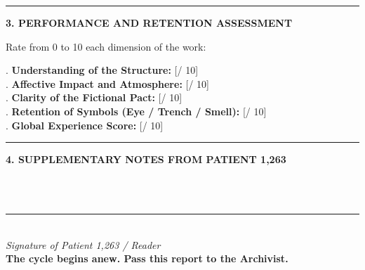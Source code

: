 \vspace{0.8em}
\noindent\rule{\textwidth}{0.5pt}
\vspace{0.5em}

\noindent\textbf{3. PERFORMANCE AND RETENTION ASSESSMENT}

\vspace{0.4em}
\noindent Rate from 0 to 10 each dimension of the work:

\vspace{0.3em}
. \textbf{Understanding of the Structure:} [\qquad / 10]\\[0.25em]
. \textbf{Affective Impact and Atmosphere:} [\qquad / 10]\\[0.25em]
. \textbf{Clarity of the Fictional Pact:} [\qquad / 10]\\[0.25em]
. \textbf{Retention of Symbols (Eye / Trench / Smell):} [\qquad / 10]\\[0.25em]
. \textbf{Global Experience Score:} [\qquad / 10]

\vspace{1em}
\noindent\rule{\textwidth}{0.5pt}
\vspace{0.5em}

\noindent\textbf{4. SUPPLEMENTARY NOTES FROM PATIENT 1,263}

\vspace{0.5em}
\noindent\dotfill\\[0.4em]
\noindent\dotfill\\[0.4em]
\noindent\dotfill

\vspace{1.5em}
\begin{center}
\rule{0.5\textwidth}{0.5pt}\\[0.4em]
\textit{Signature of Patient 1,263 / Reader}\\[0.3em]
{\small\textcolor{sangue}{\textbf{The cycle begins anew. Pass this report to the Archivist.}}}
\end{center}

\endgroup
\clearpage
